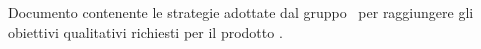 Documento contenente le strategie adottate dal gruppo \gruppo\ per raggiungere gli obiettivi qualitativi richiesti per il prodotto \progetto.
